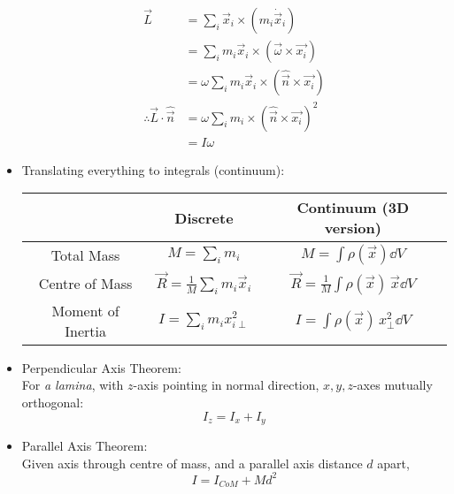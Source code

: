 \begin{itemize}
          \begin{align*}
              \vec{L}                                & = \sum_i \vec{x}_i \times (m_i \dot{\vec{x}}_i)                       \\
                                                     & = \sum_i m_i \vec{x}_i \times (\vec{\omega} \times \vec{x_i})         \\
                                                     & = \omega \sum_i m_i \vec{x}_i \times (\hat{\vec{n}} \times \vec{x_i}) \\
              \therefore \vec{L} \cdot \hat{\vec{n}} & = \omega \sum_i m_i \times (\hat{\vec{n}} \times \vec{x_i})^2         \\
                                                     & = I \omega
          \end{align*}
    \item Translating everything to integrals (continuum):
          \begin{center}
              \renewcommand{\arraystretch}{1.5}
              \begin{tabular}{|c|c|c|}
                  \hline
                                    & Discrete                                     & Continuum (3D version)                                       \\
                  \hline
                  Total Mass        & $M = \sum_i m_i$                             & $M = \int \rho(\vec{x}) \dd V$                               \\
                  \hline
                  Centre of Mass    & $\vec{R} = \frac{1}{M} \sum_i m_i \vec{x}_i$ & $\vec{R} = \frac{1}{M} \int  \rho(\vec{x}) \, \vec{x} \dd V$ \\
                  \hline
                  Moment of Inertia & $I = \sum_i m_i x_{i\perp}^2 $               & $I = \int \rho (\vec{x}) \, x_{\perp}^2\dd V$                \\
                  \hline
              \end{tabular}
          \end{center}
    \item Perpendicular Axis Theorem: \\ For \emph{a lamina}, with $z$-axis pointing in normal direction, $x,y,z$-axes mutually orthogonal: \[I_z = I_x + I_y\]
    \item Parallel Axis Theorem: \\
          Given axis through centre of mass, and a parallel axis distance $d$ apart,
          \[I = I_{CoM} + Md^2\]


\end{itemize}
